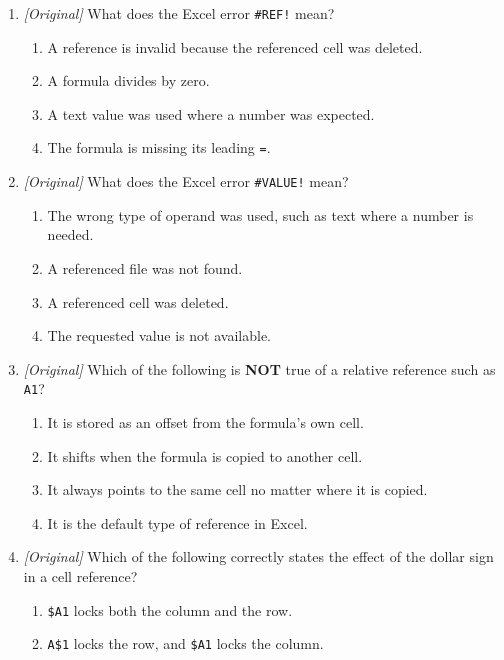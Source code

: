 \documentclass[11pt]{article}
\begin{document}
\begin{enumerate}[label=\textbf{Q\arabic*.}, leftmargin=*]
\begin{enumerate}[label=\Alph*.]
    \item The wrong type of operand was used.
    \item A function name is misspelled.
  \end{enumerate}
\item \textit{[Original]} What does the Excel error \texttt{\#REF!} mean?
  \begin{enumerate}[label=\Alph*.]
    \item A reference is invalid because the referenced cell was deleted.
    \item A formula divides by zero.
    \item A text value was used where a number was expected.
    \item The formula is missing its leading \texttt{=}.
  \end{enumerate}
\item \textit{[Original]} What does the Excel error \texttt{\#VALUE!} mean?
  \begin{enumerate}[label=\Alph*.]
    \item The wrong type of operand was used, such as text where a number is
      needed.
    \item A referenced file was not found.
    \item A referenced cell was deleted.
    \item The requested value is not available.
  \end{enumerate}
\item \textit{[Original]} Which of the following is \textbf{NOT} true of a
  relative reference such as \texttt{A1}?
  \begin{enumerate}[label=\Alph*.]
    \item It is stored as an offset from the formula's own cell.
    \item It shifts when the formula is copied to another cell.
    \item It always points to the same cell no matter where it is copied.
    \item It is the default type of reference in Excel.
  \end{enumerate}
\item \textit{[Original]} Which of the following correctly states the effect
  of the dollar sign in a cell reference?
  \begin{enumerate}[label=\Alph*.]
    \item \texttt{\$A1} locks both the column and the row.
    \item \texttt{A\$1} locks the row, and \texttt{\$A1} locks the column.

\end{enumerate}
\end{enumerate}
\end{document}
